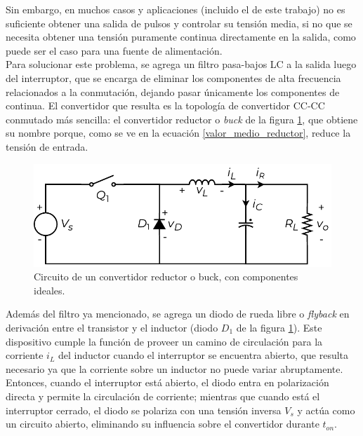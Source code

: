 Sin embargo, en muchos casos y aplicaciones (incluido el de este trabajo) no es suficiente obtener una salida de pulsos y controlar su tensión media, si no que se necesita obtener una tensión puramente continua directamente en la salida, como puede ser el caso para una fuente de alimentación.\\

Para solucionar este problema, se agrega un filtro pasa-bajos LC a la salida luego del interruptor, que se encarga de eliminar los componentes de alta frecuencia relacionados a la conmutación, dejando pasar únicamente los componentes de continua. El convertidor que resulta es la topología de convertidor CC-CC conmutado más sencilla: el {\Medium convertidor reductor} o {\Medium \textit{buck}} de la figura \ref{reductor}, que obtiene su nombre porque, como se ve en la ecuación \ref{valor_medio_reductor}, reduce la tensión de entrada.\\

\begin{figure}[H]
    \centering
    \includegraphics[scale=0.6]{Imagenes/Reductor.pdf}
    \caption{Circuito de un convertidor reductor o buck, con componentes ideales.}
    \label{reductor}
\end{figure}

Además del filtro ya mencionado, se agrega un diodo de rueda libre o \textit{flyback} en derivación entre el transistor y el inductor (diodo $D_1$ de la figura \ref{reductor}). Este dispositivo cumple la función de proveer un camino de circulación para la corriente $i_L$ del inductor cuando el interruptor se encuentra abierto, que resulta necesario ya que la corriente sobre un inductor no puede variar abruptamente. Entonces, cuando el interruptor está abierto, el diodo entra en polarización directa y permite la circulación de corriente; mientras que cuando está el interruptor cerrado, el diodo se polariza con una tensión inversa $V_s$ y actúa como un circuito abierto, eliminando su influencia sobre el convertidor durante $t_{on}$.\\

